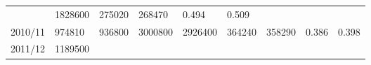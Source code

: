 \documentclass[
  spanish,
]{article}
\begin{document}
\begin{longtable}[]{@{}lllllllll@{}}
\begin{minipage}[t]{0.09\columnwidth}
\end{minipage} & \begin{minipage}[t]{0.10\columnwidth}\raggedright
1828600\strut
\end{minipage} & \begin{minipage}[t]{0.08\columnwidth}\raggedright
275020\strut
\end{minipage} & \begin{minipage}[t]{0.09\columnwidth}\raggedright
268470\strut
\end{minipage} & \begin{minipage}[t]{0.08\columnwidth}\raggedright
0.494\strut
\end{minipage} & \begin{minipage}[t]{0.09\columnwidth}\raggedright
0.509\strut
\end{minipage}\tabularnewline
\begin{minipage}[t]{0.06\columnwidth}\raggedright
2010/11\strut
\end{minipage} & \begin{minipage}[t]{0.09\columnwidth}\raggedright
974810\strut
\end{minipage} & \begin{minipage}[t]{0.10\columnwidth}\raggedright
936800\strut
\end{minipage} & \begin{minipage}[t]{0.09\columnwidth}\raggedright
3000800\strut
\end{minipage} & \begin{minipage}[t]{0.10\columnwidth}\raggedright
2926400\strut
\end{minipage} & \begin{minipage}[t]{0.08\columnwidth}\raggedright
364240\strut
\end{minipage} & \begin{minipage}[t]{0.09\columnwidth}\raggedright
358290\strut
\end{minipage} & \begin{minipage}[t]{0.08\columnwidth}\raggedright
0.386\strut
\end{minipage} & \begin{minipage}[t]{0.09\columnwidth}\raggedright
0.398\strut
\end{minipage}\tabularnewline
\begin{minipage}[t]{0.06\columnwidth}\raggedright
2011/12\strut
\end{minipage} & \begin{minipage}[t]{0.09\columnwidth}\raggedright
1189500\strut
\end{minipage} & \begin{minipage}[t]{0.10\columnwidth}\raggedright

\end{minipage}
\end{longtable}
\end{document}
